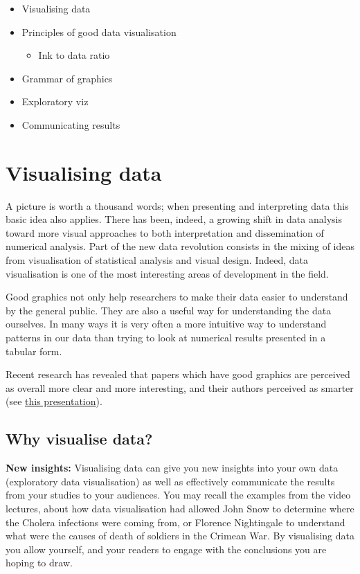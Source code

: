\documentclass[
]{book}
\providecommand{\tightlist}{%
  \setlength{\itemsep}{0pt}\setlength{\parskip}{0pt}}
\begin{document}
\begin{itemize}
\tightlist
\item
  Visualising data
\item
  Principles of good data visualisation

  \begin{itemize}
  \tightlist
  \item
    Ink to data ratio
  \end{itemize}
\item
  Grammar of graphics
\item
  Exploratory viz
\item
  Communicating results
\end{itemize}

\hypertarget{visualising-data}{%
\section{Visualising data}\label{visualising-data}}

A picture is worth a thousand words; when presenting and interpreting data this basic idea also applies. There has been, indeed, a growing shift in data analysis toward more visual approaches to both interpretation and dissemination of numerical analysis. Part of the new data revolution consists in the mixing of ideas from visualisation of statistical analysis and visual design. Indeed, data visualisation is one of the most interesting areas of development in the field.

Good graphics not only help researchers to make their data easier to understand by the general public. They are also a useful way for understanding the data ourselves. In many ways it is very often a more intuitive way to understand patterns in our data than trying to look at numerical results presented in a tabular form.

Recent research has revealed that papers which have good graphics are perceived as overall more clear and more interesting, and their authors perceived as smarter (see \href{https://vimeo.com/181771433}{this presentation}).

\hypertarget{why-visualise-data}{%
\subsection{Why visualise data?}\label{why-visualise-data}}

\textbf{New insights:} Visualising data can give you new insights into your own data (exploratory data visualisation) as well as effectively communicate the results from your studies to your audiences. You may recall the examples from the video lectures, about how data visualisation had allowed John Snow to determine where the Cholera infections were coming from, or Florence Nightingale to understand what were the causes of death of soldiers in the Crimean War. By visualising data you allow yourself, and your readers to engage with the conclusions you are hoping to draw.
\end{document}
